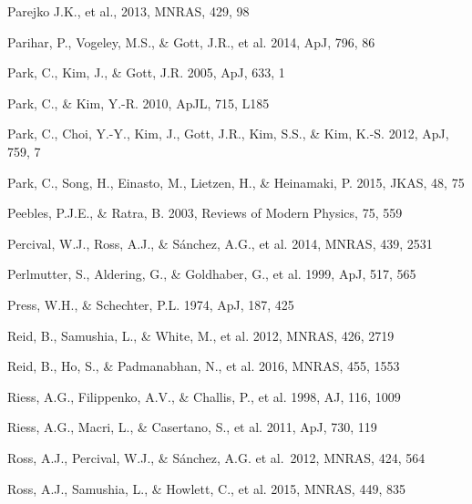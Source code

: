 \documentclass[iop]{emulateapj}
\begin{document}
\begin{thebibliography}{}

Parejko J.K., et al., 2013, MNRAS, 429, 98

Parihar, P., Vogeley, M.S., \& Gott, J.R., et al. 2014, ApJ, 796, 86

Park, C., Kim, J., \& Gott, J.R. 2005, ApJ, 633, 1  

Park, C., \& Kim, Y.-R. 2010, ApJL, 715, L185  

Park, C., Choi, Y.-Y., Kim, J., Gott, J.R., Kim, S.S., \&
Kim, K.-S. 2012, ApJ, 759, 7

Park, C., Song, H., Einasto, M., Lietzen, H., \&
Heinamaki, P. 2015, JKAS, 48, 75

Peebles, P.J.E., \& Ratra, B. 2003, Reviews of Modern Physics, 75, 559

Percival, W.J., Ross, A.J., \& S\'{a}nchez, A.G., et al. 2014, MNRAS, 439, 2531

Perlmutter, S., Aldering, G., \& Goldhaber, G., et al. 1999, ApJ, 517, 565  

Press, W.H., \& Schechter, P.L. 1974, ApJ, 187, 425

Reid, B., Samushia, L., \& White, M., et al. 2012, MNRAS, 426, 2719  

Reid, B., Ho, S., \& Padmanabhan, N., et al.  2016, MNRAS, 455, 1553

Riess, A.G., Filippenko, A.V., \& Challis, P., et al. 1998, AJ, 116, 1009  

Riess, A.G., Macri, L., \& Casertano, S., et al. 2011, ApJ, 730, 119

Ross, A.J., Percival, W.J., \& S{\'a}nchez, A.G. et al.\ 2012, MNRAS, 424, 564 

Ross, A.J., Samushia, L., \& Howlett, C., et al. 2015, MNRAS, 449, 835


\end{thebibliography}
\end{document}
